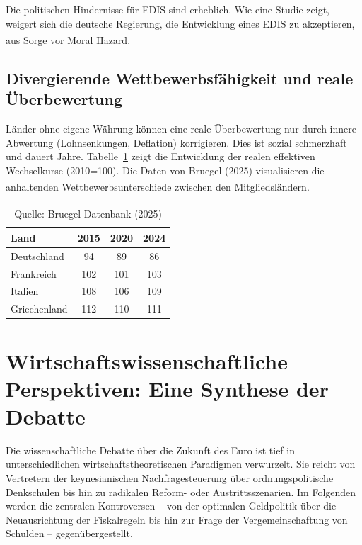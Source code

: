 \documentclass[12pt,a4paper]{article}
\newcommand{\footcite}[1]{\textsuperscript{\cite{#1}}}
\begin{document}
	Die politischen Hindernisse für EDIS sind erheblich. Wie eine Studie zeigt, weigert sich die deutsche Regierung, die Entwicklung eines EDIS zu akzeptieren, aus Sorge vor Moral Hazard.\footcite{EDISGermany}
	
	\subsection{Divergierende Wettbewerbsfähigkeit und reale Überbewertung}
	
	Länder ohne eigene Währung können eine reale Überbewertung nur durch innere Abwertung (Lohnsenkungen, Deflation) korrigieren. Dies ist sozial schmerzhaft und dauert Jahre. Tabelle~\ref{tab:wettbewerb} zeigt die Entwicklung der realen effektiven Wechselkurse (2010=100). Die Daten von Bruegel (2025) visualisieren die anhaltenden Wettbewerbsunterschiede zwischen den Mitgliedsländern.\footcite{Bruegel2025}
	
	\begin{table}[H]
		\centering
		\caption{Reale effektive Wechselkurse (preisbereinigt, 2010 = 100)}
		\label{tab:wettbewerb}
		\begin{tabular}{lccc}
			\toprule
			Land & 2015 & 2020 & 2024 \\
			\midrule
			Deutschland & 94 & 89 & 86 \\
			Frankreich & 102 & 101 & 103 \\
			Italien & 108 & 106 & 109 \\
			Griechenland & 112 & 110 & 111 \\
			\bottomrule
		\end{tabular}
		\caption*{Quelle: Bruegel-Datenbank (2025)\footcite{Bruegel2025}}
	\end{table}
	
	\section{Wirtschaftswissenschaftliche Perspektiven: Eine Synthese der Debatte}
	
	Die wissenschaftliche Debatte über die Zukunft des Euro ist tief in unterschiedlichen wirtschaftstheoretischen Paradigmen verwurzelt. Sie reicht von Vertretern der keynesianischen Nachfragesteuerung über ordnungspolitische Denkschulen bis hin zu radikalen Reform- oder Austrittsszenarien. Im Folgenden werden die zentralen Kontroversen – von der optimalen Geldpolitik über die Neuausrichtung der Fiskalregeln bis hin zur Frage der Vergemeinschaftung von Schulden – gegenübergestellt.
	
\end{document}
